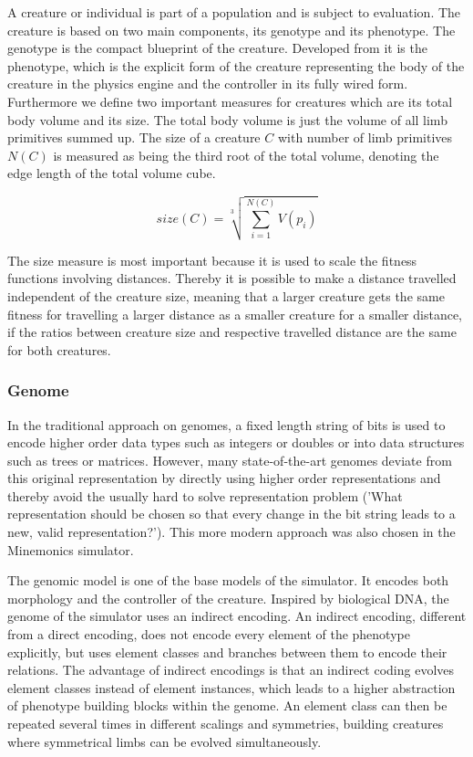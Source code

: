\documentclass[main]{subfiles}
\begin{document}
A creature or individual is part of a population and is subject to evaluation. %
%
The creature is based on two main components, its genotype and its phenotype. %
%
The genotype is the compact blueprint of the creature. %
%
Developed from it is the phenotype, which is the explicit form of the creature representing the body of the creature in the physics engine and the controller in its fully wired form. %
%
Furthermore we define two important measures for creatures which are its total body volume and its size. %
%
The total body volume is just the volume of all limb primitives summed up. %
%
The size of a creature \(C\) with number of limb primitives \(N(C)\) is measured as being the third root of the total volume, denoting the edge length of the total volume cube. 

\[size(C) = \sqrt[3]{\sum\limits^{N(C)}_{i=1} V(p_i)}\]

The size measure is most important because it is used to scale the fitness functions involving distances. %
%
Thereby it is possible to make a distance travelled independent of the creature size, meaning that a larger creature gets the same fitness for travelling a larger distance as a smaller creature for a smaller distance, if the ratios between creature size and respective travelled distance are the same for both creatures.

\subsubsection{Genome}

In the traditional approach on genomes, a fixed length string of bits is used to encode higher order data types such as integers or doubles or into data structures such as trees or matrices. %
%
However, many state-of-the-art genomes deviate from this original representation by directly using higher order representations and thereby avoid the usually hard to solve representation problem ('What representation should be chosen so that every change in the bit string leads to a new, valid representation?'). %
%
This more modern approach was also chosen in the Minemonics simulator.

The genomic model is one of the base models of the simulator. %
%
It encodes both morphology and the controller of the creature. %
%
Inspired by biological DNA, the genome of the simulator uses an indirect encoding. %
%
An indirect encoding, different from a direct encoding, does not encode every element of the phenotype explicitly, but uses element classes and branches between them to encode their relations. %
%
The advantage of indirect encodings is that an indirect coding evolves element classes instead of element instances, which leads to a higher abstraction of phenotype building blocks within the genome. %
%
An element class can then be repeated several times in different scalings and symmetries, building creatures where symmetrical limbs can be evolved simultaneously.
\end{document}
